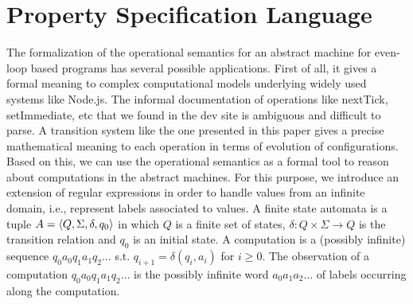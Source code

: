 %
\section{Property Specification Language}
\label{sec:psl}
%
The formalization of the operational semantics for an abstract machine for even-loop based programs 
has several possible applications. First of all, it gives a formal meaning to complex computational models underlying widely used systems like Node.js. The informal documentation of operations like nextTick, setImmediate, etc that we found in the dev site \cite{NodeDoc} is ambiguous and difficult to parse. A transition system like the one presented in this paper gives a precise mathematical meaning to each operation in terms of evolution of configurations.
Based on this, we can use the operational semantics as a formal tool to reason about computations in the abstract machines.
For this purpose, we introduce an extension of regular expressions in order to handle values from an infinite domain, i.e., represent labels associated to values.
%
A finite state automata is a tuple $A=\langle Q,\Sigma,\delta,q_0 \rangle$ in which 
$Q$ is a finite set of states, $\delta:Q\times \Sigma \rightarrow Q$ is the transition relation
and $q_0$ is an initial state. 
A computation is a (possibly infinite) sequence $q_0 a_0 q_1 a_1 q_2 \ldots$ s.t. 
$q_{i+1}=\delta(q_i,a_i)$  for $i\geq 0$.
The observation of a computation $q_0 a_0 q_1 a_1 q_2 \ldots$ is the possibly infinite word 
$a_0 a_1 a_2 \ldots$ of labels occurring along the computation.
%

